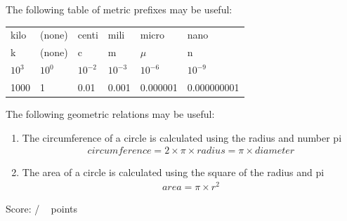 \documentclass[addpoints,12pt]{exam}
\begin{document}
The following table of metric prefixes may be useful:
\vspace{0.2in}

\begin{tabularx}{\textwidth}{ X X X X X X }
	kilo & (none) & centi & mili & micro & nano \\
	k & (none) & c & m & $\mu$ & n \\
	$10^3$ & $10^0$ & $10^{-2}$ & $10^{-3}$ & $10^{-6}$ & $10^{-9}$ \\
	1000 & 1 & 0.01 & 0.001 & 0.000001 & 0.000000001 
\end{tabularx}
 
The following geometric relations may be useful:
\begin{enumerate}
	\item The circumference of a circle is calculated using the radius and number pi
	\begin{eqnarray}
	circumference = 2\times \pi \times radius = \pi \times diameter \nonumber
	\end{eqnarray}
	\item The area of a circle is calculated using the square of the radius and pi
	\begin{eqnarray}
	area = \pi \times r^2 \nonumber
	\end{eqnarray}
\end{enumerate} 
 
\clearpage

\begin{flushright}
Score: \hspace{0.2in} / \numpoints ~ points
\end{flushright}
\end{document}

